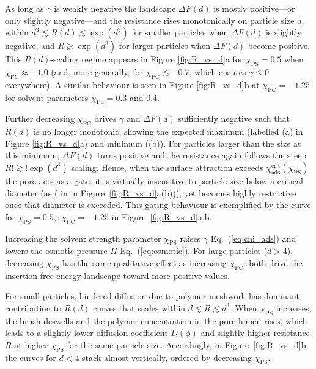 \documentclass[12pt, a4paper]{article}
\begin{document}
As long as $\gamma$ is weakly negative the landscape $\Delta F(d)$ is mostly positive—or only slightly negative—and the resistance rises monotonically on particle size $d$, within $d^3 \lesssim R(d) \lesssim \exp(d^3)$ for smaller particles when $\Delta F(d)$ is slightly negative, and $R \gtrsim \exp(d^3)$ for larger particles when $\Delta F(d)$ become positive.
This $R(d)$-scaling regime appears in Figure \ref{fig:R_vs_d}a for $\chi_{\text{PS}} = 0.5$ when $\chi_{\text{PC}}\approx -1.0$ (and, more generally, for $\chi_{\text{PC}} \lesssim -0.7$, which ensures $\gamma\le 0$ everywhere).
A similar behaviour is seen in Figure \ref{fig:R_vs_d}b at $\chi_{\text{PC}} = -1.25$ for solvent parameters $\chi_{\text{PS}} = 0.3$ and $0.4$.


Further decreasing $\chi_{\text{PC}}$ drives $\gamma$ and $\Delta F(d)$ sufficiently negative such that $R(d)$ is no longer monotonic, showing the expected maximum (labelled \raisebox{0.25em}{\scriptsize$\uparrow$}(a) in Figure \ref{fig:R_vs_d}a) and minimum (\raisebox{0.25em}{\scriptsize$\uparrow$}(b)). 
For particles larger than the size at this minimum, $\Delta F(d)$ turns positive and the resistance again follows the steep $R!\gtrsim!\exp(d^{3})$ scaling.
Hence, when the surface attraction exceeds $\chi_{\text{ads}}^{\text{crit}}(\chi_{\text{PS}})$ the pore acts as a gate: it is virtually insensitive to particle size below a critical diameter (as (\raisebox{0.25em}{\scriptsize$\uparrow$} in in Figure~\ref{fig:R_vs_d}a(b))), yet becomes highly restrictive once that diameter is exceeded.
This gating behaviour is exemplified by the curve for $\chi_{\text{PS}} = 0.5,;\chi_{\text{PC}} = -1.25$ in Figure~\ref{fig:R_vs_d}a,b.

Increasing the solvent strength parameter $\chi_{\text{PS}}$ raises $\gamma$ Eq.~(\ref{eq:chi_ads}) and lowers the osmotic pressure $\Pi$ Eq.~(\ref{eq:osmotic}).  
For large particles ($d>4$), decreasing $\chi_{\text{PS}}$ has the same qualitative effect as increasing $\chi_{\text{PC}}$: both drive the insertion-free-energy landscape toward more positive values.
  
For small particles, hindered diffusion due to polymer meshwork has dominant contribution to $R(d)$ curves that scales within $d \lesssim R \lesssim d^3$.
When $\chi_{\text{PS}}$ increases, the brush deswells and the polymer concentration in the pore lumen rises, which leads to a slightly lower diffusion coefficient $D(\phi)$ and slightly higher resistance $R$ at higher $\chi_{\text{PS}}$ for the same particle size.
Accordingly, in Figure~\ref{fig:R_vs_d}b the curves for $d<4$ stack almost vertically, ordered by decreasing $\chi_{\text{PS}}$.
\end{document}
